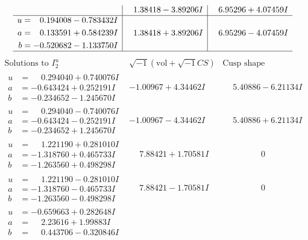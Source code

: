 \documentclass[1p]{elsarticle_modified}
\theoremstyle{definition}
\newcommand{\I}{\sqrt{-1}}
\begin{document}
$$\begin{array}{c|c|c}
 & \phantom{-}1.38418 - 3.89206 I & \phantom{-}6.95296 + 4.07459 I \\ \hline\begin{aligned}
u &= \phantom{-}0.194008 - 0.783432 I \\
a &= \phantom{-}0.133591 + 0.584239 I \\
b &= -0.520682 - 1.133750 I\end{aligned}
 & \phantom{-}1.38418 + 3.89206 I & \phantom{-}6.95296 - 4.07459 I\\
 \hline 
 \end{array}$$\newpage$$\begin{array}{c|c|c}  
\text{Solutions to }I^u_{2}& \I (\text{vol} + \sqrt{-1}CS) & \text{Cusp shape}\\
 \hline 
\begin{aligned}
u &= \phantom{-}0.294040 + 0.740076 I \\
a &= -0.643424 + 0.252191 I \\
b &= -0.234652 - 1.245670 I\end{aligned}
 & -1.00967 + 4.34462 I & \phantom{-}5.40886 - 6.21134 I \\ \hline\begin{aligned}
u &= \phantom{-}0.294040 - 0.740076 I \\
a &= -0.643424 - 0.252191 I \\
b &= -0.234652 + 1.245670 I\end{aligned}
 & -1.00967 - 4.34462 I & \phantom{-}5.40886 + 6.21134 I \\ \hline\begin{aligned}
u &= \phantom{-}1.221190 + 0.281010 I \\
a &= -1.318760 + 0.465733 I \\
b &= -1.263560 + 0.498298 I\end{aligned}
 & \phantom{-}7.88421 + 1.70581 I & \phantom{-0.000000 } 0 \\ \hline\begin{aligned}
u &= \phantom{-}1.221190 - 0.281010 I \\
a &= -1.318760 - 0.465733 I \\
b &= -1.263560 - 0.498298 I\end{aligned}
 & \phantom{-}7.88421 - 1.70581 I & \phantom{-0.000000 } 0 \\ \hline\begin{aligned}
u &= -0.659663 + 0.282648 I \\
a &= \phantom{-}2.23616 + 1.99883 I \\
b &= \phantom{-}0.443706 - 0.320846 I\end{aligned}

\end{array}$$
\end{document}
